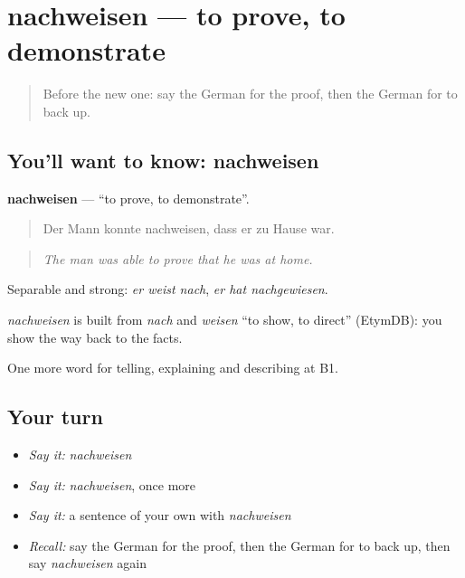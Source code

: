 \section[nachweisen]{nachweisen — to prove, to demonstrate}

\label{lesson:GE-C345-nachweisen}



\begin{quote}
Before the new one: say the German for the proof, then the German for to back up.
\end{quote}

\subsection*{You'll want to know: nachweisen}
\textbf{nachweisen} — \textquotedblleft{}to prove, to demonstrate\textquotedblright{}.

\begin{quote}
Der Mann konnte nachweisen, dass er zu Hause war.
\end{quote}

\begin{quote}
\emph{The man was able to prove that he was at home.}
\end{quote}

Separable and strong: \emph{er weist nach}, \emph{er hat nachgewiesen}.

\begin{cousinweb}
\emph{nachweisen} is built from \emph{nach} and \emph{weisen} \textquotedblleft{}to show, to direct\textquotedblright{} (EtymDB): you show the way back to the facts.
\end{cousinweb}

\begin{grammarlens}[title={What you've built}]
One more word for telling, explaining and describing at B1.
\end{grammarlens}

\subsection*{Your turn}
\begin{itemize}
\raggedright
  \item \emph{Say it:} \emph{nachweisen}
  \item \emph{Say it:} \emph{nachweisen}, once more
  \item \emph{Say it:} a sentence of your own with \emph{nachweisen}
  \item \emph{Recall:} say the German for the proof, then the German for to back up, then say \emph{nachweisen} again
\end{itemize}

